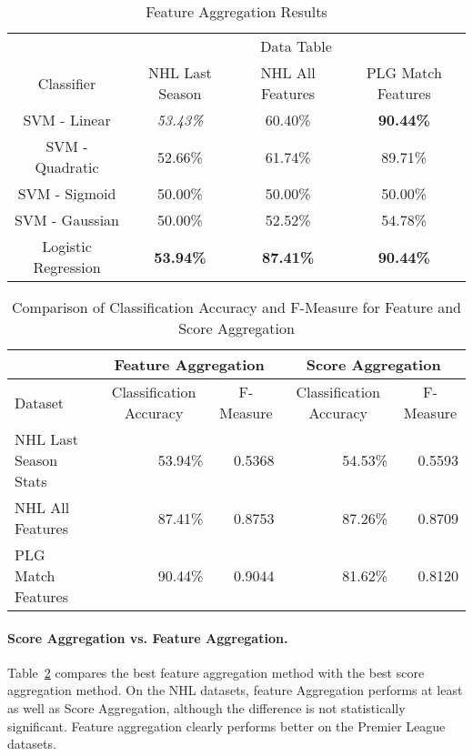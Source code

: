 \documentclass[oribibl]{llncs}%
\begin{document}
\begin{table}[htdp]
\caption{Feature Aggregation Results}
\begin{center}
\begin{tabular}{|c|c|c|c|}
& \multicolumn{3}{c|}{Data Table} \\
Classifier & NHL Last Season  & NHL All Features  & PLG Match Features \\
SVM - Linear & \textit{53.43\%} & 60.40\% & \textbf{90.44\%} \\
SVM - Quadratic & 52.66\% & 61.74\% & 89.71\% \\
SVM - Sigmoid & 50.00\% & 50.00\% & 50.00\% \\
SVM - Gaussian & 50.00\% & 52.52\% & 54.78\% \\
Logistic Regression & \textbf{53.94\%} & \textbf{87.41\%} & \textbf{90.44\%} \\
\end{tabular}
\end{center}
\label{table:feature-agg}
\end{table}%


\begin{table}[htbp]
\caption{Comparison of Classification Accuracy and F-Measure for Feature and Score Aggregation}
\begin{tabular}{|l|r|r|r|r|}
\hline
 & \multicolumn{2}{c|}{Feature Aggregation} & \multicolumn{2}{c|}{Score Aggregation} \\ \hline
Dataset & \multicolumn{1}{c|}{Classification Accuracy} &\multicolumn{1}{c|}{F-Measure} & \multicolumn{1}{c|}{Classification Accuracy} &\multicolumn{1}{c|}{F-Measure}\\\hline \cline{ 1- 1}
NHL Last Season Stats & 53.94\% & 0.5368 & 54.53\% & 0.5593 \\ \hline
NHL All Features & 87.41\% & 0.8753 & 87.26\% & 0.8709 \\ \hline
PLG Match Features & 90.44\% & 0.9044 & 81.62\% & 0.8120 \\ \hline
\end{tabular}
\label{table:compare-all}
\end{table}


\paragraph{Score Aggregation vs. Feature Aggregation.} Table~\ref{table:compare-all} compares the best feature aggregation method with the best score aggregation method. On the NHL datasets, feature Aggregation performs at least as well as Score Aggregation, although the difference is not statistically significant. Feature aggregation  clearly performs better on the Premier League datasets. 
\end{document}
